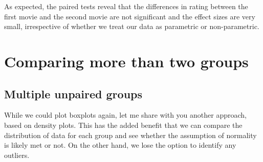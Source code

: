 \documentclass[
]{book}
\newenvironment{Shaded}{\begin{snugshade}}{\end{snugshade}}
\newcommand{\AttributeTok}[1]{\textcolor[rgb]{0.77,0.63,0.00}{#1}}
\newcommand{\DocumentationTok}[1]{\textcolor[rgb]{0.56,0.35,0.01}{\textbf{\textit{#1}}}}
\newcommand{\FunctionTok}[1]{\textcolor[rgb]{0.00,0.00,0.00}{#1}}
\newcommand{\NormalTok}[1]{#1}
\newcommand{\OtherTok}[1]{\textcolor[rgb]{0.56,0.35,0.01}{#1}}
\newcommand{\SpecialCharTok}[1]{\textcolor[rgb]{0.00,0.00,0.00}{#1}}
\newcommand{\StringTok}[1]{\textcolor[rgb]{0.31,0.60,0.02}{#1}}
\begin{document}
\begin{Shaded}
\end{Shaded}

As expected, the paired tests reveal that the differences in rating between the first movie and the second movie are not significant and the effect sizes are very small, irrespective of whether we treat our data as parametric or non-parametric.

\hypertarget{comparing-more-than-two-groups}{%
\section{Comparing more than two groups}\label{comparing-more-than-two-groups}}

\hypertarget{multiple-unpaired-groups}{%
\subsection{Multiple unpaired groups}\label{multiple-unpaired-groups}}

While we could plot boxplots again, let me share with you another approach, based on density plots. This has the added benefit that we can compare the distribution of data for each group and see whether the assumption of normality is likely met or not. On the other hand, we lose the option to identify any outliers.
\end{document}
